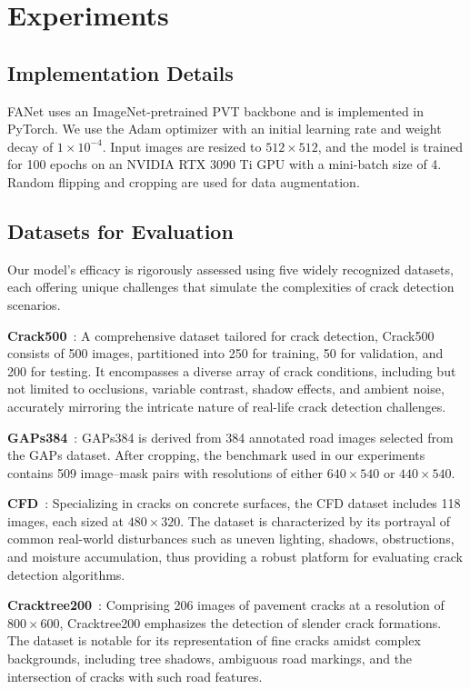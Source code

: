 \documentclass[journal]{IEEEtran}
\begin{document}
\section{Experiments}
\subsection{Implementation Details}
FANet uses an ImageNet-pretrained PVT backbone and is implemented in PyTorch. We use the Adam optimizer with an initial learning rate and weight decay of $1 \times 10^{-4}$. Input images are resized to $512 \times 512$, and the model is trained for 100 epochs on an NVIDIA RTX 3090 Ti GPU with a mini-batch size of 4. Random flipping and cropping are used for data augmentation.





\subsection{Datasets for Evaluation}
Our model's efficacy is rigorously assessed using five widely recognized datasets, each offering unique challenges that simulate the complexities of crack detection scenarios.

\textbf{Crack500}~\cite{DBLP:journals/tits/YangZYPML20}: A comprehensive dataset tailored for crack detection, Crack500 consists of 500 images, partitioned into 250 for training, 50 for validation, and 200 for testing. It encompasses a diverse array of crack conditions, including but not limited to occlusions, variable contrast, shadow effects, and ambient noise, accurately mirroring the intricate nature of real-life crack detection challenges.

\textbf{GAPs384}~\cite{DBLP:conf/ijcnn/EisenbachSSADSE17,DBLP:journals/tits/YangZYPML20}: GAPs384 is derived from 384 annotated road images selected from the GAPs dataset. After cropping, the benchmark used in our experiments contains 509 image--mask pairs with resolutions of either $640 \times 540$ or $440 \times 540$.

\textbf{CFD}~\cite{DBLP:journals/tits/ShiCQMC16}: Specializing in cracks on concrete surfaces, the CFD dataset includes 118 images, each sized at $480 \times 320$. The dataset is characterized by its portrayal of common real-world disturbances such as uneven lighting, shadows, obstructions, and moisture accumulation, thus providing a robust platform for evaluating crack detection algorithms.

\textbf{Cracktree200}~\cite{DBLP:journals/prl/ZouCLMW12}: Comprising 206 images of pavement cracks at a resolution of $800 \times 600$, Cracktree200 emphasizes the detection of slender crack formations. The dataset is notable for its representation of fine cracks amidst complex backgrounds, including tree shadows, ambiguous road markings, and the intersection of cracks with such road features.
\end{document}
